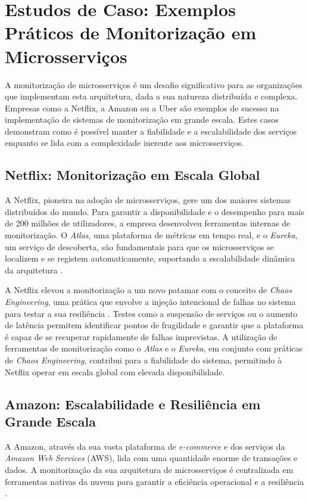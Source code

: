\section{Estudos de Caso: Exemplos Práticos de Monitorização em Microsserviços}

A monitorização de microsserviços é um desafio significativo para as organizações que implementam esta arquitetura, dada a sua natureza distribuída e complexa. Empresas como a Netflix, a Amazon ou a Uber são exemplos de sucesso na implementação de sistemas de monitorização em grande escala. Estes casos demonstram como é possível manter a fiabilidade e a escalabilidade dos serviços enquanto se lida com a complexidade inerente aos microsserviços.

\subsection{Netflix: Monitorização em Escala Global}

A Netflix, pioneira na adoção de microsserviços, gere um dos maiores sistemas distribuídos do mundo. Para garantir a disponibilidade e o desempenho para mais de 200 milhões de utilizadores, a empresa desenvolveu ferramentas internas de monitorização. O \textit{Atlas}, uma plataforma de métricas em tempo real, e o \textit{Eureka}, um serviço de descoberta, são fundamentais para que os microsserviços se localizem e se registem automaticamente, suportando a escalabilidade dinâmica da arquitetura \cite{Newman2015}.

A Netflix elevou a monitorização a um novo patamar com o conceito de \textit{Chaos Engineering}, uma prática que envolve a injeção intencional de falhas no sistema para testar a sua resiliência \cite{Basiri2019}. Testes como a suspensão de serviços ou o aumento de latência permitem identificar pontos de fragilidade e garantir que a plataforma é capaz de se recuperar rapidamente de falhas imprevistas. A utilização de ferramentas de monitorização como o \textit{Atlas} e o \textit{Eureka}, em conjunto com práticas de \textit{Chaos Engineering}, contribui para a fiabilidade do sistema, permitindo à Netflix operar em escala global com elevada disponibilidade.

\subsection{Amazon: Escalabilidade e Resiliência em Grande Escala}

A Amazon, através da sua vasta plataforma de \textit{e-commerce} e dos serviços da \textit{ Amazon Web Services} (AWS), lida com uma quantidade enorme de transações e dados. A monitorização da sua arquitetura de microsserviços é centralizada em ferramentas nativas da nuvem para garantir a eficiência operacional e a resiliência \cite{Dragoni2017}.

